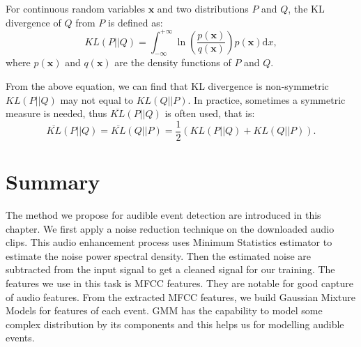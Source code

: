 For continuous random variables $\mathbf{x}$ and two distributions $P$ and $Q$, the KL divergence of $Q$ from $P$ is defined as:
\begin{equation}
KL(P||Q) = \int_{-\infty}^{+\infty}\ln(\frac{p(\mathbf{x})}{q(\mathbf{x})})p(\mathbf{x})\mathrm{d}x,
\label{eq:kl}
\end{equation}
where $p(\mathbf{x})$ and $q(\mathbf{x})$ are the density functions of $P$ and $Q$.

From the above equation, we can find that KL divergence is non-symmetric \ie $KL(P||Q)$ may not equal to $KL(Q||P)$. In practice, sometimes a symmetric measure is needed, thus $\overline{KL}(P||Q)$ is often used, that is:
\begin{equation}
\overline{KL}(P||Q) = \overline{KL}(Q||P) = \frac{1}{2}(KL(P||Q) + KL(Q||P)).
\end{equation}

\section{Summary}
The method we propose for audible event detection are introduced in this chapter. 
We first apply a noise reduction technique on the downloaded audio clips. 
This audio enhancement process uses Minimum Statistics estimator to estimate the noise power spectral density. 
Then the estimated noise are subtracted from the input signal to get a cleaned signal for our training. 
The features we use in this task is MFCC features. 
They are notable for good capture of audio features. 
From the extracted MFCC features, we build Gaussian Mixture Models for features of each event. 
GMM has the capability to model some complex distribution by its components and this helps us for modelling audible events. 
